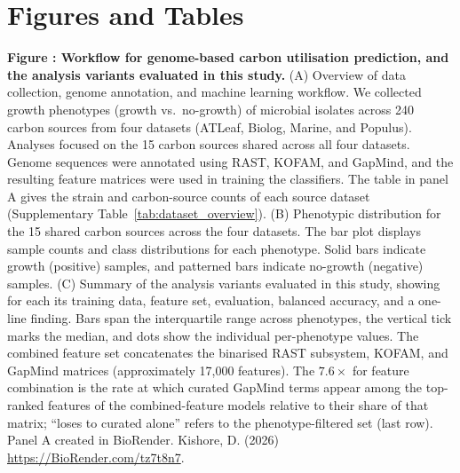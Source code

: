 

\clearpage
\section*{Figures and Tables}

\label{fig:dataset_characteristics}%
\noindent\textbf{Figure : Workflow for genome-based carbon utilisation prediction, and the analysis variants evaluated in this study.}
(A) Overview of data collection, genome annotation, and machine learning workflow.
We collected growth phenotypes (growth vs.\ no-growth) of microbial isolates across 240 carbon sources from four datasets (ATLeaf, Biolog, Marine, and Populus).
Analyses focused on the 15 carbon sources shared across all four datasets.
Genome sequences were annotated using RAST, KOFAM, and GapMind, and the resulting feature matrices were used in training the classifiers.
The table in panel A gives the strain and carbon-source counts of each source dataset (Supplementary Table~\ref{tab:dataset_overview}).
(B) Phenotypic distribution for the 15 shared carbon sources across the four datasets.
The bar plot displays sample counts and class distributions for each phenotype.
Solid bars indicate growth (positive) samples, and patterned bars indicate no-growth (negative) samples.
(C) Summary of the analysis variants evaluated in this study, showing for each its training data, feature set, evaluation, balanced accuracy, and a one-line finding.
Bars span the interquartile range across phenotypes, the vertical tick marks the median, and dots show the individual per-phenotype values.
The combined feature set concatenates the binarised RAST subsystem, KOFAM, and GapMind matrices (approximately 17,000 features).
The $7.6\times$ for feature combination is the rate at which curated GapMind terms appear among the top-ranked features of the combined-feature models relative to their share of that matrix; ``loses to curated alone'' refers to the phenotype-filtered set (last row).
Panel A created in BioRender. Kishore, D. (2026) \url{https://BioRender.com/tz7t8n7}.

